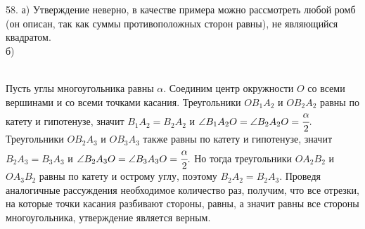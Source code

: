 58. а) Утверждение неверно, в качестве примера можно рассмотреть любой ромб (он описан, так как суммы противоположных сторон равны), не являющийся квадратом.\\
б) \begin{figure}[ht!]
\end{figure}\\
Пусть углы многоугольника равны $\alpha.$ Соединим центр окружности $O$ со всеми вершинами и со всеми точками касания. Треугольники $OB_1A_2$ и $OB_2A_2$ равны по катету и гипотенузе, значит $B_1A_2=B_2A_2$ и $\angle B_1A_2O=\angle B_2A_2O=\cfrac{\alpha}{2}.$ Треугольники $OB_2A_3$ и $OB_3A_3$ также равны по катету и гипотенузе, значит $B_2A_3=B_3A_3$ и $\angle B_2A_3O=\angle B_3A_3O=\cfrac{\alpha}{2}.$ Но тогда треугольники $OA_2B_2$ и $OA_3B_2$ равны по катету и острому углу, поэтому $B_2A_2=B_2A_3.$ Проведя аналогичные рассуждения необходимое количество раз, получим, что все отрезки, на которые точки касания разбивают стороны, равны, а значит равны все стороны многоугольника, утверждение является верным.\\
